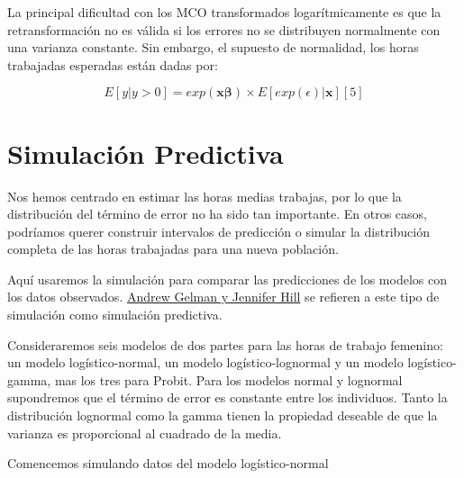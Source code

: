 \documentclass[
  letterpaper,
  DIV=11,
  numbers=noendperiod]{scrreprt}
\newenvironment{Shaded}{\begin{snugshade}}{\end{snugshade}}
\newcommand{\DecValTok}[1]{\textcolor[rgb]{0.68,0.00,0.00}{#1}}
\newcommand{\FunctionTok}[1]{\textcolor[rgb]{0.28,0.35,0.67}{#1}}
\newcommand{\NormalTok}[1]{\textcolor[rgb]{0.00,0.23,0.31}{#1}}
\newcommand{\OtherTok}[1]{\textcolor[rgb]{0.00,0.23,0.31}{#1}}
\newcommand{\SpecialCharTok}[1]{\textcolor[rgb]{0.37,0.37,0.37}{#1}}
\begin{document}
La principal dificultad con los MCO transformados logarítmicamente es
que la retransformación no es válida si los errores no se distribuyen
normalmente con una varianza constante. Sin embargo, el supuesto de
normalidad, los horas trabajadas esperadas están dadas por:

\[E[y|y>0]=exp(\mathbf{x\beta})\times E[exp(\epsilon)|\mathbf{x}][5]\]

\section{Simulación Predictiva}\label{simulaciuxf3n-predictiva}

Nos hemos centrado en estimar las horas medias trabajas, por lo que la
distribución del término de error no ha sido tan importante. En otros
casos, podríamos querer construir intervalos de predicción o simular la
distribución completa de las horas trabajadas para una nueva población.

Aquí usaremos la simulación para comparar las predicciones de los
modelos con los datos observados.
\href{http://www.stat.columbia.edu/~gelman/arm/}{Andrew Gelman y
Jennifer Hill} se refieren a este tipo de simulación como simulación
predictiva.

Consideraremos seis modelos de dos partes para las horas de trabajo
femenino: un modelo logístico-normal, un modelo logístico-lognormal y un
modelo logístico-gamma, mas los tres para Probit. Para los modelos
normal y lognormal supondremos que el término de error es constante
entre los individuos. Tanto la distribución lognormal como la gamma
tienen la propiedad deseable de que la varianza es proporcional al
cuadrado de la media.

Comencemos simulando datos del modelo logístico-normal

\begin{Shaded}
\end{Shaded}
\end{document}
